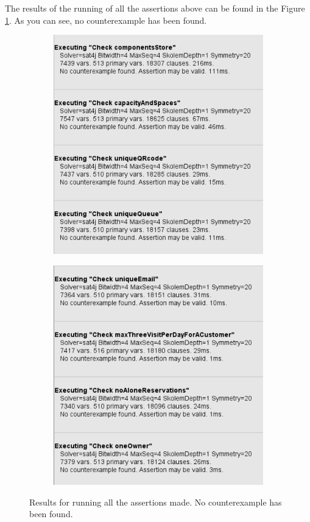 \documentclass[a4paper, 12pt, oneside]{article}
\begin{document}
The results of the running of all the assertions above can be found in the Figure \ref{check_alloy}. As you can see, no counterexample has been found.
\newpage
\begin{figure}[h!]
\centering
\begin{subfigure}
	\centering
  	\includegraphics[height=0.4\textheight, scale=0.2, keepaspectratio]{img/alloy/img_check_1.PNG}
 \end{subfigure}
 \begin{subfigure}
	\centering
  	\includegraphics[height=0.4\textheight, scale=0.2, keepaspectratio]{img/alloy/img_check_2.PNG}
 \end{subfigure}
	\caption{Results for running all the assertions made. No counterexample has been found.}
 	\label{check_alloy}
\end{figure}
\newpage
\end{document}
